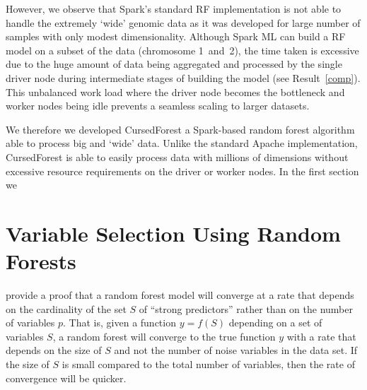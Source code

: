 \documentclass[10pt,letterpaper]{article}
\begin{document}

However, we observe that Spark's standard RF implementation is not able to handle the extremely `wide' genomic data as it was developed for large number of samples with only modest dimensionality. 
Although Spark ML can build a RF model on a subset of the data (chromosome 1~and~2), the time taken is excessive due to the huge amount of data being aggregated and processed by the single driver node during intermediate stages of building the model (see Result~\ref{comp}). 
This unbalanced work load where the driver node becomes the bottleneck and worker nodes being idle prevents a seamless scaling to larger datasets.


We therefore we developed CursedForest a Spark-based random forest algorithm able to process big and `wide' data. Unlike the standard Apache implementation, CursedForest is able to easily process data with millions of dimensions without excessive resource requirements on the driver or worker nodes.
In the first section we 


\section*{Variable Selection Using Random Forests}



\cite{Biau.2012} provide a proof that a random forest model will converge at a rate that depends on the cardinality of
the set $S$ of  ``strong predictors'' rather than on the number of variables $p$. That is, given a function $y=f(S)$
depending on a set of variables $S$, a random forest will converge to the true function $y$ with a rate that depends on
the size of $S$ and not the number of noise variables in the data set. If the size of $S$ is small compared to the total
number of variables, then the rate of convergence will be quicker. 
\end{document}
